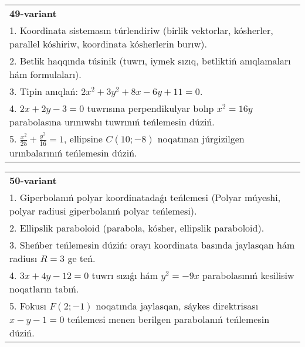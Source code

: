 \documentclass{article}
\begin{document}
\begin{tabular}{m{17cm}}
\textbf{49-variant}\\
1. Koordinata sistemasın túrlendiriw (birlik vektorlar, kósherler, parallel kóshiriw, koordinata kósherlerin burıw).\\

2. Betlik haqqında túsinik (tuwrı, iymek sızıq, betliktiń anıqlamaları hám formulaları).\\

3. Tipin anıqlań: $2 x^{2}+3 y^{2}+8 x-6 y+11=0$.\\

4. $2x + 2y - 3 = 0$ tuwrısına perpendikulyar bolıp $x^{2} = 16y$ parabolasına urınıwshı tuwrınıń teńlemesin dúziń.  \\

5. $\frac{x^{2}}{25} + \frac{y^{2}}{16} = 1$, ellipsine $C(10; - 8)$ noqatınan júrgizilgen urınbalarınıń teńlemesin dúziń.  
\end{tabular}
\vspace{1cm}


\begin{tabular}{m{17cm}}
\textbf{50-variant}\\
1. Giperbolanıń polyar koordinatadaǵı teńlemesi (Polyar múyeshi, polyar radiusi giperbolanıń polyar teńlemesi).\\

2. Ellipslik paraboloid (parabola, kósher, ellipslik paraboloid).\\

3. Sheńber teńlemesin dúziń: orayı koordinata basında jaylasqan hám radiusı $R=3$ ge teń.\\

4. $3x + 4y - 12 = 0$ tuwrı sızıǵı hám $y^{2} = - 9x$ parabolasınıń kesilisiw noqatların tabıń.  \\

5. Fokusı $F(2; - 1)$ noqatında jaylasqan, sáykes direktrisası $x - y - 1 = 0$ teńlemesi menen berilgen parabolanıń teńlemesin dúziń.  
\end{tabular}
\vspace{1cm}
\end{document}
